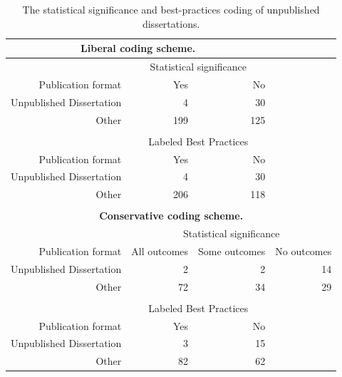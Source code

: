 \documentclass[man, mask]{apa6}
\begin{document}
\begin{table}[htbp]
	\centering
	\caption{The statistical significance and best-practices coding of unpublished dissertations.}
	\begin{tabular}{rrrr}
		\toprule
		\multicolumn{3}{c}{\textbf{Liberal coding scheme.}} &  \\
		\midrule
		& \multicolumn{2}{c}{Statistical significance} &  \\
		Publication format & Yes   & No    &  \\
		Unpublished Dissertation & 4     & 30    &  \\
		Other & 199   & 125   &  \\
		&       &       &  \\
		& \multicolumn{2}{c}{Labeled Best Practices} &  \\
		Publication format & Yes   & No    &  \\
		Unpublished Dissertation & 4     & 30    &  \\
		Other & 206   & 118   &  \\
		&       &       &  \\
		\multicolumn{4}{c}{\textbf{Conservative coding scheme.}} \\
		& \multicolumn{3}{c}{Statistical significance} \\
		Publication format & All outcomes   & Some outcomes & No outcomes \\
		Unpublished Dissertation & 2     & 2     & 14 \\
		Other & 72    & 34    & 29 \\
		&       &       &  \\
		& \multicolumn{2}{c}{Labeled Best Practices} &  \\
		Publication format & Yes   & No    &  \\
		Unpublished Dissertation & 3     & 15    &  \\
		Other & 82    & 62    &  \\
		\bottomrule
	\end{tabular}%
	\label{table:dissertations}%
\end{table}
\end{document}
